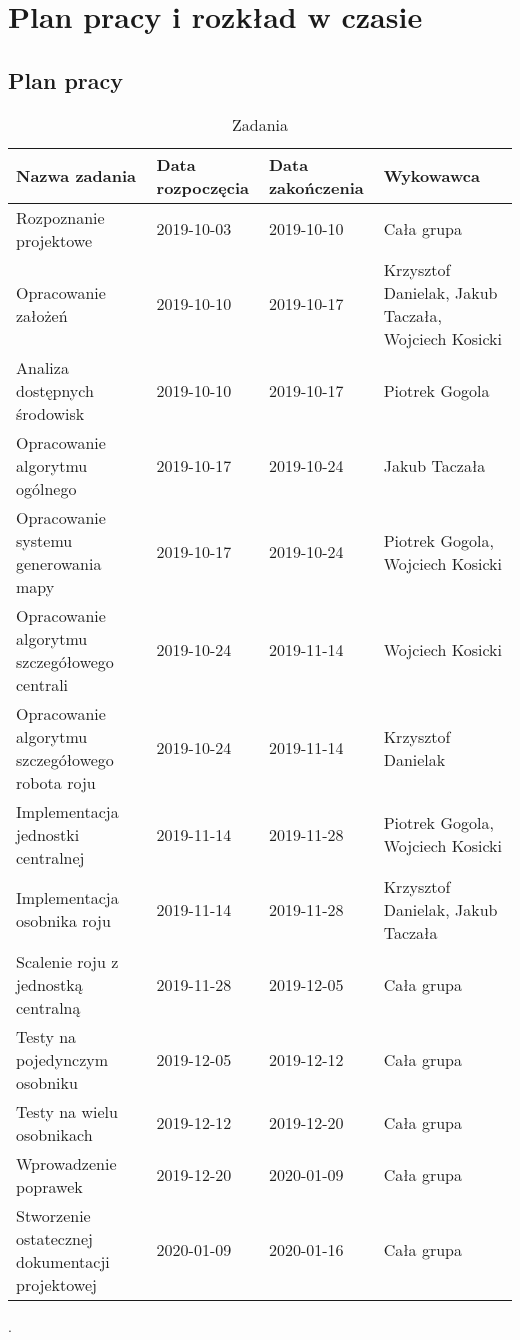 \section{Plan pracy i rozkład w czasie}
\label{sec:plac_pracy_kamienie_milowe_i_rozklad_w_czasie} %
\subsection{Plan pracy}
\begin{table}[h!]
\begin{center}
\begin{tabular}{|p{6cm}|p{2.2cm}|p{2.2cm}|p{3.2cm}|} %
\hline
Nazwa zadania & Data rozpoczęcia & Data zakończenia & Wykowawca \\ \hline
Rozpoznanie projektowe & 2019-10-03 & 2019-10-10 & Cała grupa\\ \hline
Opracowanie założeń & 2019-10-10 & 2019-10-17 & Krzysztof Danielak, Jakub Taczała, Wojciech Kosicki\\ \hline
Analiza dostępnych środowisk & 2019-10-10 & 2019-10-17 & Piotrek Gogola \\ \hline
Opracowanie algorytmu ogólnego & 2019-10-17 & 2019-10-24 & Jakub Taczała\\ \hline
Opracowanie systemu generowania mapy & 2019-10-17 & 2019-10-24 & Piotrek Gogola, Wojciech Kosicki\\ \hline
Opracowanie algorytmu szczegółowego centrali  & 2019-10-24 & 2019-11-14 & Wojciech Kosicki\\ \hline
Opracowanie algorytmu szczegółowego robota roju  & 2019-10-24 & 2019-11-14 & Krzysztof Danielak\\ \hline
Implementacja jednostki centralnej & 2019-11-14 & 2019-11-28 & Piotrek Gogola,  Wojciech Kosicki\\ \hline
Implementacja osobnika roju & 2019-11-14 & 2019-11-28 & Krzysztof Danielak, Jakub Taczała\\ \hline
Scalenie roju z jednostką centralną & 2019-11-28 & 2019-12-05 &  Cała grupa\\ \hline
Testy na pojedynczym osobniku & 2019-12-05 & 2019-12-12 &  Cała grupa\\ \hline
Testy na wielu osobnikach & 2019-12-12 & 2019-12-20 &  Cała grupa\\ \hline
Wprowadzenie poprawek & 2019-12-20 & 2020-01-09 &  Cała grupa\\ \hline
Stworzenie ostatecznej dokumentacji projektowej & 2020-01-09 & 2020-01-16 &  Cała grupa\\ \hline
\end{tabular}.
\end{center}
\caption{\label{rj}Zadania} %
\end{table}